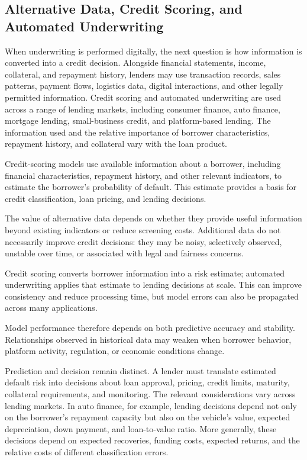 \subsection[Alternative Data, Credit Scoring, and Automated Underwriting]{Alternative Data, Credit Scoring, and Automated Underwriting}

When underwriting is performed digitally, the next question
is how information is converted into a credit decision.
Alongside financial statements, income, collateral, and
repayment history, lenders may use transaction records,
sales patterns, payment flows, logistics data, digital
interactions, and other legally permitted information.
Credit scoring and automated underwriting are used across
a range of lending markets, including consumer finance,
auto finance, mortgage lending, small-business credit,
and platform-based lending. The information used and
the relative importance of borrower characteristics,
repayment history, and collateral vary with the loan
product.

Credit-scoring models use available information about a
borrower, including financial characteristics, repayment
history, and other relevant indicators, to estimate the
borrower's probability of default. This estimate provides
a basis for credit classification, loan pricing, and
lending decisions.

The value of alternative data depends on whether they provide useful information beyond existing indicators or reduce screening costs. Additional data do not necessarily improve credit decisions: they may be noisy, selectively observed, unstable over time, or associated with legal and fairness concerns.

Credit scoring converts borrower information into a risk estimate; automated underwriting applies that estimate to lending decisions at scale. This can improve consistency and reduce processing time, but model errors can also be propagated across many applications.

Model performance therefore depends on both predictive accuracy and stability. Relationships observed in historical data may weaken when borrower behavior, platform activity, regulation, or economic conditions change.

Prediction and decision remain distinct. A lender must
translate estimated default risk into decisions about
loan approval, pricing, credit limits, maturity,
collateral requirements, and monitoring. The relevant
considerations vary across lending markets. In auto
finance, for example, lending decisions depend not only
on the borrower's repayment capacity but also on the
vehicle's value, expected depreciation, down payment,
and loan-to-value ratio. More generally, these decisions
depend on expected recoveries, funding costs, expected
returns, and the relative costs of different
classification errors.

